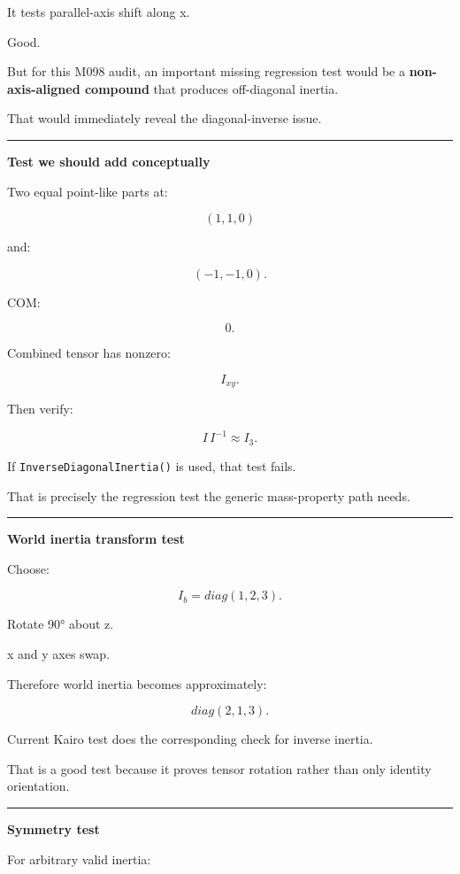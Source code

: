 It tests parallel-axis shift along x.

Good.

But for this M098 audit, an important missing regression test would be a \textbf{non-axis-aligned compound} that produces off-diagonal inertia.

That would immediately reveal the diagonal-inverse issue.

\begin{center}\rule{0.5\linewidth}{0.5pt}\end{center}

\textbf{Test we should add conceptually}

Two equal point-like parts at:

\[
(1,1,0)
\]

and:

\[
(-1,-1,0).
\]

COM:

\[
0.
\]

Combined tensor has nonzero:

\[
I_{xy}.
\]

Then verify:

\[
I\,I^{-1}
\approx
I_3.
\]

If \texttt{InverseDiagonalInertia()} is used, that test fails.

That is precisely the regression test the generic mass-property path needs.

\begin{center}\rule{0.5\linewidth}{0.5pt}\end{center}

\textbf{World inertia transform test}

Choose:

\[
I_b=
diag(1,2,3).
\]

Rotate 90° about z.

x and y axes swap.

Therefore world inertia becomes approximately:

\[
diag(2,1,3).
\]

Current Kairo test does the corresponding check for inverse inertia.

That is a good test because it proves tensor rotation rather than only identity orientation.

\begin{center}\rule{0.5\linewidth}{0.5pt}\end{center}

\textbf{Symmetry test}

For arbitrary valid inertia:

